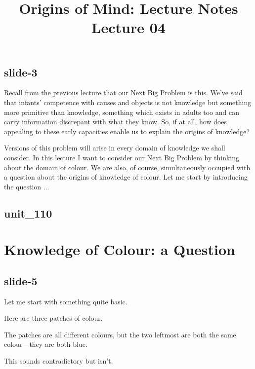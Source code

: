 \documentclass[12pt,\papersize]{extarticle}
\begin{document}
\setlength\footnotesep{1em}






\title {Origins of Mind: Lecture Notes \\ Lecture 04}
 
 
 
\maketitle
 
\subsection{slide-3}
Recall from the previous lecture that our Next Big Problem is this. 
We've said that infants' competence with causes and objects is not knowledge but something 
more primitive than knowledge, something which exists in adults too and can carry information 
discrepant with what they know. So, if at all, how does appealing to these early capacities 
enable us to explain the origins of knowledge?
 
Versions of this problem will arise in every domain of knowledge we shall consider.
In this lecture I want to consider our Next Big Problem by thinking about the domain of colour.
We are also, of course, simultaneously occupied with a question about the origins of knowledge
of colour.
Let me start by introducing the question ...
 
\subsection{unit\_110}
 
 
\section{Knowledge of Colour: a Question}
 
\subsection{slide-5}
Let me start with something quite basic.
 
Here are three patches of colour.
 
The patches are all different colours, but the two leftmost are both the same colour---they are both blue.
 
This sounds contradictory but isn't.
 
\end{document}
